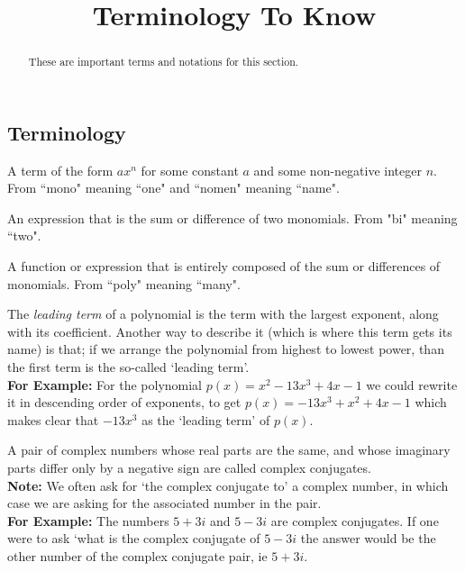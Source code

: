 \documentclass{ximera}
\title{Terminology To Know}
\begin{document}
\begin{abstract}
    These are important terms and notations for this section.
\end{abstract}
\maketitle

\subsection*{Terminology}
\begin{definition}[Monomial]
    A term of the form $ax^n$ for some constant $a$ and some non-negative integer $n$. From ``mono" meaning ``one" and ``nomen" meaning ``name".
\end{definition} 

\begin{definition}[Binomial]
    An expression that is the sum or difference of two monomials. From "bi" meaning ``two".
\end{definition} 

 \begin{definition}[Polynomial]
    A function or expression that is entirely composed of the sum or differences of monomials. From ``poly" meaning ``many".
\end{definition} 

\begin{definition}
    The \textit{leading term} of a polynomial is the term with the largest exponent, along with its coefficient. Another way to describe it (which is where this term gets its name) is that; if we arrange the polynomial from highest to lowest power, than the first term is the so-called `leading term'.\\
    \textbf{For Example:} For the polynomial $p(x) = x^2 - 13x^3 + 4x - 1$ we could rewrite it in descending order of exponents, to get $p(x) = -13x^3 + x^2 + 4x - 1$ which makes clear that $-13x^3$ as the `leading term' of $p(x)$.
\end{definition} 

\begin{definition}
    A pair of complex numbers whose real parts are the same, and whose imaginary parts differ only by a negative sign are called complex conjugates. \\
    \textbf{Note:} We often ask for `the complex conjugate to' a complex number, in which case we are asking for the associated number in the pair. \\
    \textbf{For Example:} The numbers $5 + 3i$ and $5 - 3i$ are complex conjugates. If one were to ask `what is the complex conjugate of $5 - 3i$ the answer would be the other number of the complex conjugate pair, ie $5 + 3i$.
\end{definition} 
\end{document}
